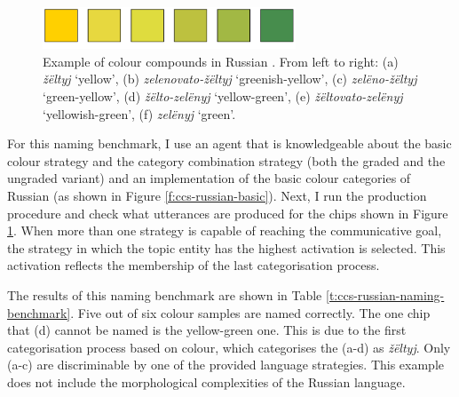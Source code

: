 \begin{figure}[htpb]
  \centering
  \includegraphics[height=1.25cm]{./category-combination/figures/russian-compounds.pdf}
  \caption[Example of colour compounds in Russian]{Example of colour
    compounds in Russian \citep{safuanova07russian}. From left to
    right: (a) \textit{\v z\"eltyj} `yellow', (b) \textit{zelenovato-\v z\"eltyj} 
    `greenish-yellow', (c) \textit{zel\"eno-\v z\"eltyj} `green-yellow',
    (d) \textit{\v z\"elto-zel\"enyj} `yellow-green', (e) \textit{\v z\"eltovato-zel\"enyj}
    `yellowish-green', (f) \textit{zel\"enyj} `green'.}
  \label{f:ccs-russian-compounds}
\end{figure}

For this naming benchmark, 
I use an agent that is knowledgeable about
the basic colour strategy and the category combination
  strategy (both the graded and the ungraded variant) and an implementation of the
basic colour categories of Russian (as shown in Figure
\ref{f:ccs-russian-basic}). Next, I run the production procedure and
check what utterances are produced for the chips shown in Figure
\ref{f:ccs-russian-compounds}. When more than one strategy is capable
of reaching the communicative goal, the strategy in which the topic
entity has the highest activation is selected. This activation
reflects the membership of the last categorisation process.

The results of this naming benchmark are shown in Table
\ref{t:ccs-russian-naming-benchmark}. Five out of six colour samples
are named correctly. The one chip that (d) cannot be named is the
yellow-green one. This is due to the first categorisation process
based on colour, which categorises the (a-d) as \textit{\v z\"eltyj}. Only (a-c)
are discriminable by one of the provided language strategies. This
example does not include the morphological complexities of the Russian
language.

